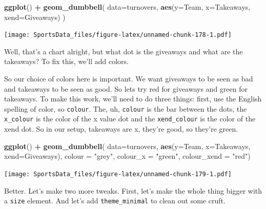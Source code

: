 \documentclass[
]{book}
\newenvironment{Shaded}{\begin{snugshade}}{\end{snugshade}}
\newcommand{\DataTypeTok}[1]{\textcolor[rgb]{0.13,0.29,0.53}{#1}}
\newcommand{\KeywordTok}[1]{\textcolor[rgb]{0.13,0.29,0.53}{\textbf{#1}}}
\newcommand{\NormalTok}[1]{#1}
\newcommand{\OperatorTok}[1]{\textcolor[rgb]{0.81,0.36,0.00}{\textbf{#1}}}
\newcommand{\StringTok}[1]{\textcolor[rgb]{0.31,0.60,0.02}{#1}}
\begin{document}
\begin{Shaded}
\begin{Highlighting}[]
\KeywordTok{ggplot}\NormalTok{() }\OperatorTok{+}\StringTok{ }
\StringTok{  }\KeywordTok{geom_dumbbell}\NormalTok{(}
    \DataTypeTok{data=}\NormalTok{turnovers, }
    \KeywordTok{aes}\NormalTok{(}\DataTypeTok{y=}\NormalTok{Team, }\DataTypeTok{x=}\NormalTok{Takeaways, }\DataTypeTok{xend=}\NormalTok{Giveaways)}
\NormalTok{  )}
\end{Highlighting}
\end{Shaded}

\texttt{[image: SportsData\_files/figure-latex/unnamed-chunk-178-1.pdf]}

Well, that's a chart alright, but what dot is the giveaways and what are the takeaways? To fix this, we'll add colors.

So our choice of colors here is important. We want giveaways to be seen as bad and takeaways to be seen as good. So lets try red for giveaways and green for takeaways. To make this work, we'll need to do three things: first, use the English spelling of color, so \texttt{colour}. The, uh, \texttt{colour} is the bar between the dots, the \texttt{x\_colour} is the color of the x value dot and the \texttt{xend\_colour} is the color of the xend dot. So in our setup, takeaways are x, they're good, so they're green.

\begin{Shaded}
\begin{Highlighting}[]
\KeywordTok{ggplot}\NormalTok{() }\OperatorTok{+}\StringTok{ }
\StringTok{  }\KeywordTok{geom_dumbbell}\NormalTok{(}
    \DataTypeTok{data=}\NormalTok{turnovers, }
    \KeywordTok{aes}\NormalTok{(}\DataTypeTok{y=}\NormalTok{Team, }\DataTypeTok{x=}\NormalTok{Takeaways, }\DataTypeTok{xend=}\NormalTok{Giveaways),}
    \DataTypeTok{colour =} \StringTok{"grey"}\NormalTok{,}
    \DataTypeTok{colour_x =} \StringTok{"green"}\NormalTok{,}
    \DataTypeTok{colour_xend =} \StringTok{"red"}\NormalTok{)}
\end{Highlighting}
\end{Shaded}

\texttt{[image: SportsData\_files/figure-latex/unnamed-chunk-179-1.pdf]}

Better. Let's make two more tweaks. First, let's make the whole thing bigger with a \texttt{size} element. And let's add \texttt{theme\_minimal} to clean out some cruft.
\end{document}
